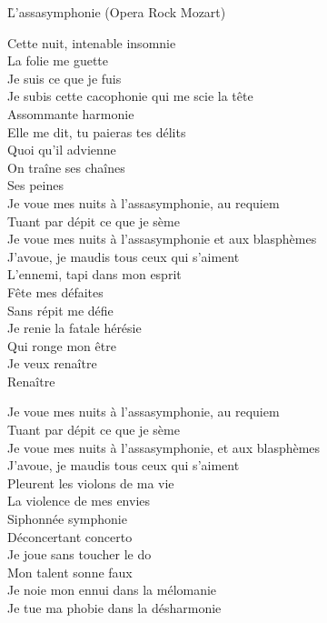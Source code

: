 \documentclass{novel}
\begin{document}
\newpage
\normalsize
\h*{L'assasymphonie (Opera Rock Mozart)}
\begin{multicols}{2}
Cette nuit, intenable insomnie \\
La folie me guette \\
Je suis ce que je fuis \\
Je subis cette cacophonie qui me scie la tête \\
Assommante harmonie \\

Elle me dit, tu paieras tes délits \\
Quoi qu'il advienne \\
On traîne ses chaînes \\
Ses peines \\

Je voue mes nuits à l'assasymphonie, au requiem \\
Tuant par dépit ce que je sème \\
Je voue mes nuits à l'assasymphonie et aux blasphèmes \\
J'avoue, je maudis tous ceux qui s'aiment \\
L'ennemi, tapi dans mon esprit \\
Fête mes défaites \\
Sans répit me défie \\
Je renie la fatale hérésie \\
Qui ronge mon être \\
Je veux renaître \\
Renaître \\

\columnbreak

Je voue mes nuits à l'assasymphonie, au requiem \\
Tuant par dépit ce que je sème \\
Je voue mes nuits à l'assasymphonie, et aux blasphèmes \\
J'avoue, je maudis tous ceux qui s'aiment \\

Pleurent les violons de ma vie \\
La violence de mes envies \\
Siphonnée symphonie \\
Déconcertant concerto \\
Je joue sans toucher le do \\
Mon talent sonne faux \\

Je noie mon ennui dans la mélomanie \\
Je tue ma phobie dans la désharmonie \\



\end{multicols}
\end{document}
